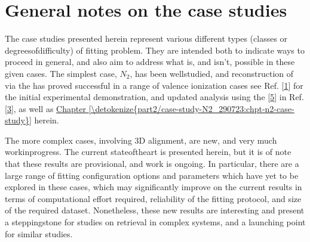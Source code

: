 \documentclass[letterpaper,table,10pt,english]{jupyterBook}
\begin{document}
\section{General notes on the case studies}
\label{\detokenize{part2/extracting_matrix_elements_overview_270423:general-notes-on-the-case-studies}}
\sphinxAtStartPar
The case studies presented herein represent various different types (classes or degrees\sphinxhyphen{}of\sphinxhyphen{}difficulty) of fitting problem. They are intended both to indicate ways to proceed in general, and also aim to address what is, and isn’t, possible in these given cases. The simplest case, \(N_2\), has been well\sphinxhyphen{}studied, and reconstruction of {\hyperref[\detokenize{backmatter/glossary:term-radial-matrix-elements}]{}} via the {\hyperref[\detokenize{backmatter/glossary:term-bootstrap-retrieval-protocol}]{}} has proved successful in a range of valence ionization cases \sphinxhyphen{} see Ref. {[}\hyperlink{cite.backmatter/bibliography:id775}{1}{]} for the initial experimental demonstration, and updated analysis using the  {[}\hyperlink{cite.backmatter/bibliography:id681}{5}{]} in Ref. {[}\hyperlink{cite.backmatter/bibliography:id685}{3}{]}, as well as \hyperref[\detokenize{part2/case-study-N2_290723:chpt-n2-case-study}]{Chapter \ref{\detokenize{part2/case-study-N2_290723:chpt-n2-case-study}}} herein.

\sphinxAtStartPar
The more complex cases, involving 3D alignment, are new, and very much work\sphinxhyphen{}in\sphinxhyphen{}progress. The current state\sphinxhyphen{}of\sphinxhyphen{}the\sphinxhyphen{}art is presented herein, but it is of note that these results are provisional, and work is ongoing. In particular, there are a large range of fitting configuration options and parameters which have yet to be explored in these cases, which may significantly improve on the current results in terms of computational effort required, reliability of the fitting protocol, and size of the required dataset. Nonetheless, these new results are interesting and present a stepping\sphinxhyphen{}stone for studies on {\hyperref[\detokenize{backmatter/glossary:term-radial-matrix-elements}]{}} retrieval in complex systems, and a launching point for similar studies.
\end{document}
